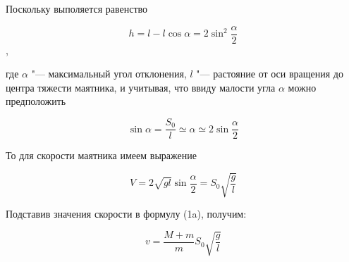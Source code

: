 Поскольку выполяется равенство

\begin{equation}
        h=l-l\cos\alpha =2\sin ^2\frac{\alpha }{2} 
\end{equation},

где $\alpha$ "--- максимальный угол отклонения,
$l$ "--- растояние от оси вращения до центра тяжести маятника,
и учитывая, что ввиду малости угла $\alpha$ можно предположить

\begin{equation} 
        \sin \alpha =\frac{S_0}{l}\simeq\alpha\simeq 2\sin\frac{\alpha}{2}  
\end{equation}

То для скорости маятника имеем выражение

\begin{equation} 
        V=2\sqrt{gl}\sin\frac{\alpha}{2}=S_0\sqrt{\frac{g}{l}} 
\end{equation}

Подставив значения скорости в формулу (1a), получим:

\begin{equation} 
        v=\frac{M+m}{m}S_0\sqrt{\frac{g}{l}}
\end{equation}